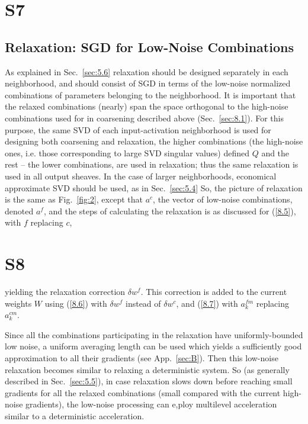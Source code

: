 \documentclass{article} %
\begin{document}
\section{S7}
\subsection{Relaxation: SGD for Low-Noise Combinations}
\label{sec:sgd_relaxation}
As explained in Sec.~\ref{sec:5.6} relaxation should be designed separately in each neighborhood, and should consist of SGD in terms of the low-noise normalized combinations of parameters belonging to the neighborhood. It is important that the relaxed combinations (nearly) span the space orthogonal to the high-noise combinations used for in coarsening described above (Sec.~\ref{sec:8.1}). For this purpose, the same SVD of each input-activation neighborhood is used for designing both coarsening and relaxation, the higher combinations (the high-noise ones, i.e. those corresponding to large SVD singular values) defined $Q$ and the rest -- the lower combinations, are used in relaxation; thus the same relaxation is used in all output sheaves. In the case of larger neighborhoods, economical approximate SVD should be used, as in Sec.~\ref{sec:5.4} So, the picture of relaxation is the same as Fig.~\ref{fig:2}, except that $a^c$, the vector of low-noise combinations, denoted $a^f$, and the steps of calculating the relaxation is as discussed for (\ref{8.5}), with $f$ replacing $c$,

\section{S8}
yielding the relaxation correction $\delta w^f$. This correction is added to the current weights $W$ using (\ref{8.6}) with $\delta w^f$ instead of $\delta w^c$, and (\ref{8.7}) with $a^{fm}_k$ replacing $a^{cm}_k$.

Since all the combinations participating in the relaxation have uniformly-bounded low noise, a uniform averaging length can be used which yields a sufficiently good approximation to all their gradients (see App.~\ref{sec:B}). Then this low-noise relaxation becomes similar to relaxing a deterministic system. So (as generally described in Sec.~\ref{sec:5.5}), in case relaxation slows down before reaching small gradients for all the relaxed combinations (small compared with the current high-noise gradients), the low-noise processing can e,ploy multilevel acceleration similar to a deterministic acceleration.
\end{document}
